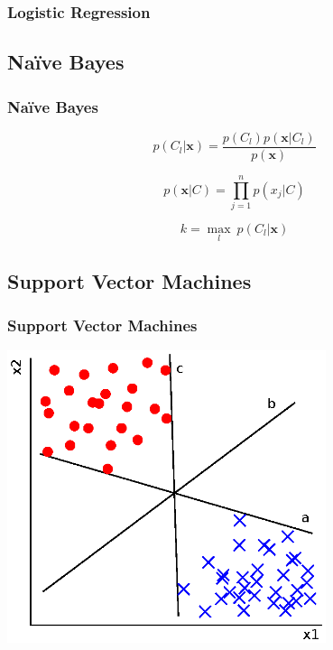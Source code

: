 \documentclass[10pt]{beamer}
\begin{document}
\begin{frame}
	\frametitle{Logistic Regression}
	\begin{figure}[htbp]
		\centering
	\end{figure}
\end{frame}

\subsection{Na\"ive Bayes}

\begin{frame}
	\frametitle{Na\"ive Bayes}
	\[p(C_l|\bm{x}) = \frac{p(C_l)p(\bm{x}|C_l)}{p(\bm{x})}\]
	
	\[p(\bm{x}|C) = \prod_{j=1}^n{p(x_j|C)}\]
	
	\[k = \underset{l}{\operatorname{max}}\ p(C_l|\bm{x})\]
\end{frame}

\subsection{Support Vector Machines}

\begin{frame}
	\frametitle{Support Vector Machines}
	\centering\includegraphics[width=0.7\textwidth]{highMargin}
\end{frame}
\end{document}
